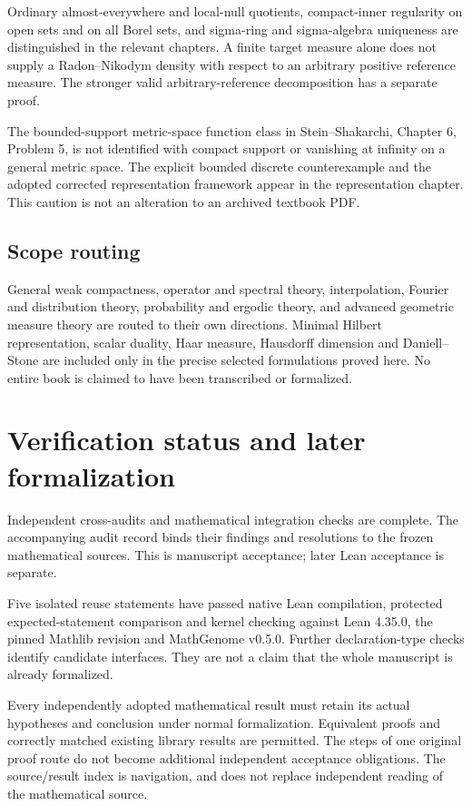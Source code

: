 \documentclass[11pt,oneside,openany]{book}
\theoremstyle{definition}
\theoremstyle{remark}
\begin{document}
Ordinary almost-everywhere and local-null quotients, compact-inner regularity on open sets and on all Borel sets, and sigma-ring and sigma-algebra uniqueness are distinguished in the relevant chapters. A finite target measure alone does not supply a Radon--Nikodym density with respect to an arbitrary positive reference measure. The stronger valid arbitrary-reference decomposition has a separate proof.

The bounded-support metric-space function class in Stein--Shakarchi, Chapter 6, Problem 5, is not identified with compact support or vanishing at infinity on a general metric space. The explicit bounded discrete counterexample and the adopted corrected representation framework appear in the representation chapter. This caution is not an alteration to an archived textbook PDF.

\section*{Scope routing}

General weak compactness, operator and spectral theory, interpolation, Fourier and distribution theory, probability and ergodic theory, and advanced geometric measure theory are routed to their own directions. Minimal Hilbert representation, scalar duality, Haar measure, Hausdorff dimension and Daniell--Stone are included only in the precise selected formulations proved here. No entire book is claimed to have been transcribed or formalized.



\chapter*{Verification status and later formalization}
Independent cross-audits and mathematical integration checks are complete. The accompanying audit record binds their findings and resolutions to the frozen mathematical sources. This is manuscript acceptance; later Lean acceptance is separate.

Five isolated reuse statements have passed native Lean compilation, protected expected-statement comparison and kernel checking against Lean 4.35.0, the pinned Mathlib revision and MathGenome v0.5.0. Further declaration-type checks identify candidate interfaces. They are not a claim that the whole manuscript is already formalized.

Every independently adopted mathematical result must retain its actual hypotheses and conclusion under normal formalization. Equivalent proofs and correctly matched existing library results are permitted. The steps of one original proof route do not become additional independent acceptance obligations. The source/result index is navigation, and does not replace independent reading of the mathematical source.

\end{document}
